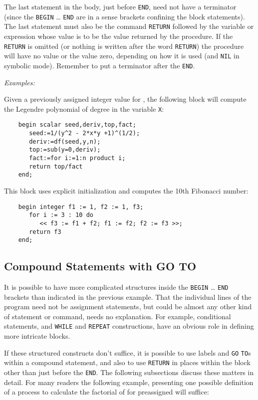 The last statement in the body, just before \texttt{END}, need not have a
terminator (since the \texttt{BEGIN} \ldots{} \texttt{END} are in a sense brackets
confining the block statements).  The last statement must also be the
command \texttt{RETURN} followed by the variable or
expression whose value is to be the value returned by the procedure.  If
the \texttt{RETURN} is omitted (or nothing is written after the word
\texttt{RETURN}) the procedure will have no value or the value zero, depending
on how it is used (and \texttt{NIL} in symbolic mode).  Remember to put a
terminator after the \texttt{END}.

\textit{Examples:}

Given a previously assigned integer value for , the following block
will compute the Legendre polynomial of degree  in the variable
\texttt{X}:
\begin{verbatim}
    begin scalar seed,deriv,top,fact;
       seed:=1/(y^2 - 2*x*y +1)^(1/2);
       deriv:=df(seed,y,n);
       top:=sub(y=0,deriv);
       fact:=for i:=1:n product i;
       return top/fact
    end;
\end{verbatim}

This block uses explicit initialization and computes the 10th Fibonacci number:
\begin{verbatim}
    begin integer f1 := 1, f2 := 1, f3;
       for i := 3 : 10 do
          << f3 := f1 + f2; f1 := f2; f2 := f3 >>;
       return f3
    end;
\end{verbatim}

\subsection{Compound Statements with GO TO}

It is possible to have more complicated structures inside the \texttt{BEGIN}
\ldots{} \texttt{END} brackets than indicated in the
previous example.  That the individual lines of the program need not be
assignment statements, but could be almost any other
kind of statement or command, needs no explanation.  For example,
conditional statements, and \texttt{WHILE} and \texttt{REPEAT}
 constructions, have an obvious role in defining more
intricate blocks.

If these structured constructs don't suffice, it is possible to use labels
 and \texttt{GO} \texttt{TO}s within a compound
statement, and also to use \texttt{RETURN}
 in places within the block other than just before the
\texttt{END}.  The following subsections discuss these matters in detail.
For many readers the following example, presenting one possible definition
of a process to calculate the factorial of  for preassigned 
will suffice:

